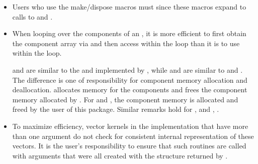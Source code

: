            
\begin{itemize}
                                        
\item
  Users who use the make/dispose macros must                 
   since these macros expand to calls to     
   and .                                             
  
\item
  When looping over the components of an  , it is     
  more efficient to first obtain the component array via       
   and then access  within the     
  loop than it is to use  within the loop.        
                                                               
   and  are similar to the  and  
   implemented by {\nvecs}, while  and 
    are similar to   and . 
  The difference is one of responsibility for component memory     
  allocation and deallocation.  allocates memory  
  for the  components and  frees the     
  component memory allocated by . For    
  and , the component memory is allocated and      
  freed by the user of this package. Similar remarks hold for  
  ,   and ,              
  .                                            

\item
  To maximize efficiency, vector kernels in the {\nvecs} implementation
  that have more than one  argument do not check for
  consistent internal representation of these vectors. It is the user's 
  responsibility to ensure that such routines are called with 
  arguments that were all created with the  structure returned
  by .

\end{itemize}
